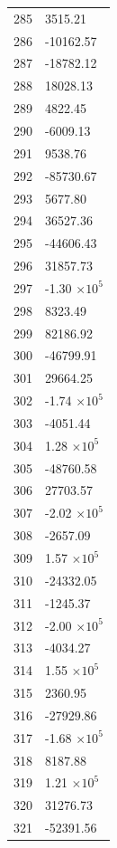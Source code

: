 \documentclass[a4paper,11pt]{article}
\begin{document}
\begin{center}
\begin{longtable}{|R{1.5cm}|R{2.6cm}|}
  285 &      3515.21 \\
  286 &    -10162.57 \\
  287 &    -18782.12 \\
  288 &     18028.13 \\
  289 &      4822.45 \\
  290 &     -6009.13 \\
  291 &      9538.76 \\
  292 &    -85730.67 \\
  293 &      5677.80 \\
  294 &     36527.36 \\
  295 &    -44606.43 \\
  296 &     31857.73 \\
  297 &        -1.30 $\times 10^{           5}$ \\
  298 &      8323.49 \\
  299 &     82186.92 \\
  300 &    -46799.91 \\
  301 &     29664.25 \\
  302 &        -1.74 $\times 10^{           5}$ \\
  303 &     -4051.44 \\
  304 &         1.28 $\times 10^{           5}$ \\
  305 &    -48760.58 \\
  306 &     27703.57 \\
  307 &        -2.02 $\times 10^{           5}$ \\
  308 &     -2657.09 \\
  309 &         1.57 $\times 10^{           5}$ \\
  310 &    -24332.05 \\
  311 &     -1245.37 \\
  312 &        -2.00 $\times 10^{           5}$ \\
  313 &     -4034.27 \\
  314 &         1.55 $\times 10^{           5}$ \\
  315 &      2360.95 \\
  316 &    -27929.86 \\
  317 &        -1.68 $\times 10^{           5}$ \\
  318 &      8187.88 \\
  319 &         1.21 $\times 10^{           5}$ \\
  320 &     31276.73 \\
  321 &    -52391.56 \\

\end{longtable}
\end{center}
\end{document}
